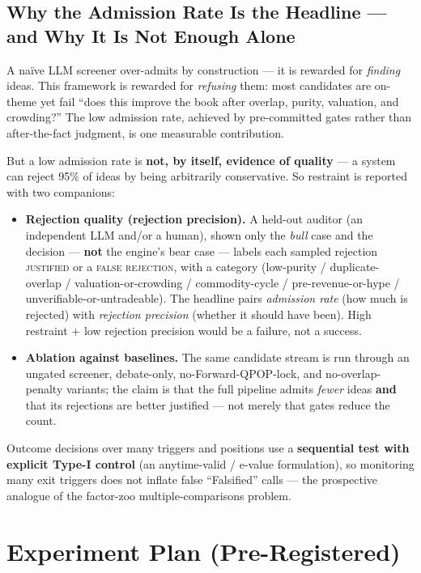 \documentclass[11pt]{article}
\begin{document}
\subsection*{Why the Admission Rate Is the Headline --- and Why It Is Not Enough Alone}

A na\"{i}ve LLM screener over-admits by construction --- it is rewarded for \emph{finding} ideas.
This framework is rewarded for \emph{refusing} them: most candidates are on-theme yet fail ``does
this improve the book after overlap, purity, valuation, and crowding?'' The low admission rate,
achieved by pre-committed gates rather than after-the-fact judgment, is one measurable contribution.

But a low admission rate is \textbf{not, by itself, evidence of quality} --- a system can reject
95\% of ideas by being arbitrarily conservative. So restraint is reported with two companions:

\begin{itemize}
  \item \textbf{Rejection quality (rejection precision).} A held-out auditor (an independent LLM
    and/or a human), shown only the \emph{bull} case and the decision --- \textbf{not} the engine's
    bear case --- labels each sampled rejection \textsc{justified} or a \textsc{false rejection},
    with a category (low-purity / duplicate-overlap / valuation-or-crowding / commodity-cycle /
    pre-revenue-or-hype / unverifiable-or-untradeable). The headline pairs \emph{admission rate}
    (how much is rejected) with \emph{rejection precision} (whether it should have been). High
    restraint + low rejection precision would be a failure, not a success.

  \item \textbf{Ablation against baselines.} The same candidate stream is run through an ungated
    screener, debate-only, no-Forward-QPOP-lock, and no-overlap-penalty variants; the claim is that
    the full pipeline admits \emph{fewer} ideas \textbf{and} that its rejections are better
    justified --- not merely that gates reduce the count.
\end{itemize}

Outcome decisions over many triggers and positions use a \textbf{sequential test with explicit
Type-I control} (an anytime-valid / e-value formulation), so monitoring many exit triggers does not
inflate false ``Falsified'' calls --- the prospective analogue of the factor-zoo
multiple-comparisons problem.

\section{Experiment Plan (Pre-Registered)}
\label{sec:experiment-plan}
\end{document}
